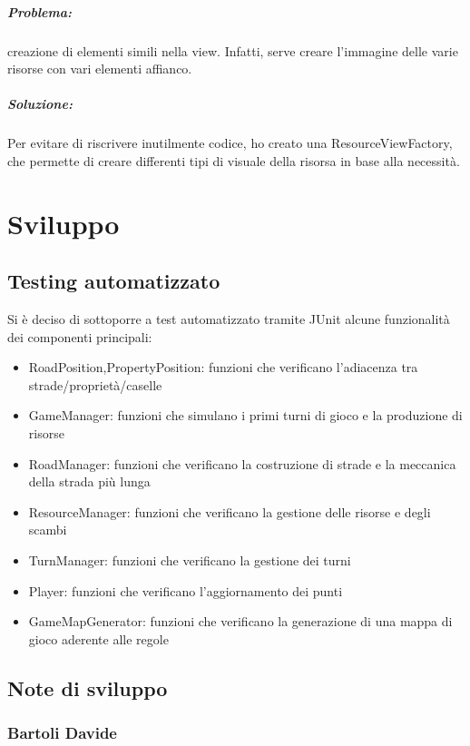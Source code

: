\documentclass[a4paper,12pt]{report}
\begin{document}
\paragraph{Problema:} creazione di elementi simili nella view. Infatti, serve creare l'immagine delle varie risorse con vari elementi affianco.
\paragraph{Soluzione:} Per evitare di riscrivere inutilmente codice, ho creato una ResourceViewFactory, che permette di creare differenti tipi di visuale della risorsa in base alla necessit\`a.

\chapter{Sviluppo}
\section{Testing automatizzato}
Si è deciso di sottoporre a test automatizzato tramite JUnit alcune funzionalità dei componenti principali:
\begin{itemize}
    \item RoadPosition,PropertyPosition: funzioni che verificano l'adiacenza tra strade/proprietà/caselle
    \item GameManager: funzioni che simulano i primi turni di gioco e la produzione di risorse
    \item RoadManager: funzioni che verificano la costruzione di strade e la meccanica della strada più lunga
    \item ResourceManager: funzioni che verificano la gestione delle risorse e degli scambi
    \item TurnManager: funzioni che verificano la gestione dei turni
    \item Player: funzioni che verificano l'aggiornamento dei punti
    \item GameMapGenerator: funzioni che verificano la generazione di una mappa di gioco aderente alle regole
\end{itemize}


\section{Note di sviluppo}
\subsection{Bartoli Davide}
\end{document}
